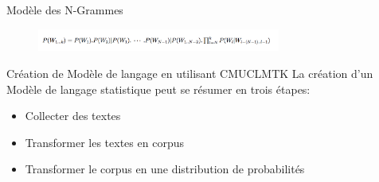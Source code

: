 \begin{frame}{Modèle des N-Grammes}
\begin{figure}
\centering
\includegraphics[width=8cm]{images/modele_langage.png}
\end{figure}
\end{frame}

\begin{frame}{Création de Modèle de langage en utilisant CMUCLMTK}
La création d'un Modèle de langage statistique peut se résumer en trois étapes:
\begin{itemize}
\item Collecter des textes
\item Transformer les textes en corpus
\item Transformer le corpus en une distribution de probabilités
\end{itemize}
\end{frame}

